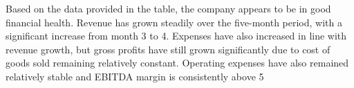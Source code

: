 

Based on the data provided in the table, the company appears to be in good financial health. Revenue has grown steadily over the five-month period, with a significant increase from month 3 to 4. Expenses have also increased in line with revenue growth, but gross profits have still grown significantly due to cost of goods sold remaining relatively constant. Operating expenses have also remained relatively stable and EBITDA margin is consistently above 5%